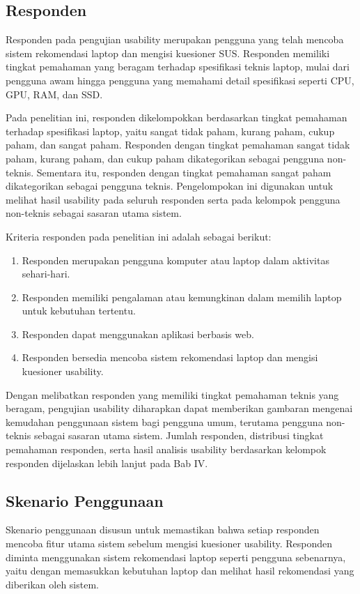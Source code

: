 \subsection{Responden}
Responden pada pengujian usability merupakan pengguna yang telah mencoba sistem rekomendasi laptop dan mengisi kuesioner SUS. Responden memiliki tingkat pemahaman yang beragam terhadap spesifikasi teknis laptop, mulai dari pengguna awam hingga pengguna yang memahami detail spesifikasi seperti CPU, GPU, RAM, dan SSD.

Pada penelitian ini, responden dikelompokkan berdasarkan tingkat pemahaman terhadap spesifikasi laptop, yaitu sangat tidak paham, kurang paham, cukup paham, dan sangat paham. Responden dengan tingkat pemahaman sangat tidak paham, kurang paham, dan cukup paham dikategorikan sebagai pengguna non-teknis. Sementara itu, responden dengan tingkat pemahaman sangat paham dikategorikan sebagai pengguna teknis. Pengelompokan ini digunakan untuk melihat hasil usability pada seluruh responden serta pada kelompok pengguna non-teknis sebagai sasaran utama sistem.

\noindent Kriteria responden pada penelitian ini adalah sebagai berikut:
\begin{enumerate}
    \item Responden merupakan pengguna komputer atau laptop dalam aktivitas sehari-hari.
    \item Responden memiliki pengalaman atau kemungkinan dalam memilih laptop untuk kebutuhan tertentu.
    \item Responden dapat menggunakan aplikasi berbasis web.
    \item Responden bersedia mencoba sistem rekomendasi laptop dan mengisi kuesioner usability.
\end{enumerate}

Dengan melibatkan responden yang memiliki tingkat pemahaman teknis yang beragam, pengujian usability diharapkan dapat memberikan gambaran mengenai kemudahan penggunaan sistem bagi pengguna umum, terutama pengguna non-teknis sebagai sasaran utama sistem. Jumlah responden, distribusi tingkat pemahaman responden, serta hasil analisis usability berdasarkan kelompok responden dijelaskan lebih lanjut pada Bab IV.

\subsection{Skenario Penggunaan}
Skenario penggunaan disusun untuk memastikan bahwa setiap responden mencoba fitur utama sistem sebelum mengisi kuesioner usability. Responden diminta menggunakan sistem rekomendasi laptop seperti pengguna sebenarnya, yaitu dengan memasukkan kebutuhan laptop dan melihat hasil rekomendasi yang diberikan oleh sistem.

